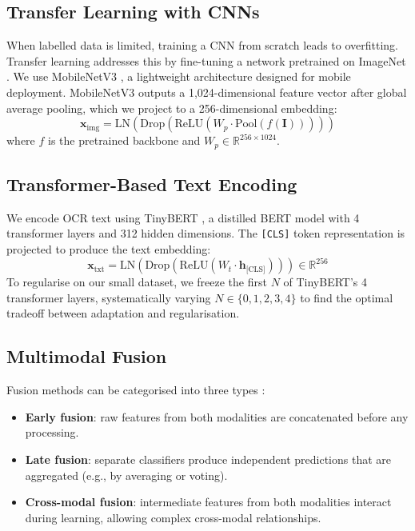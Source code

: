 \documentclass{article}
\begin{document}
\subsection{Transfer Learning with CNNs}

When labelled data is limited, training a CNN from scratch leads to overfitting. Transfer learning addresses this by fine-tuning a network pretrained on ImageNet \citep{krizhevsky2012imagenet}. We use MobileNetV3 \citep{howard2019mobilenet}, a lightweight architecture designed for mobile deployment. MobileNetV3 outputs a 1,024-dimensional feature vector after global average pooling, which we project to a 256-dimensional embedding:
\begin{equation}
    \mathbf{x}_{\text{img}} = \text{LN}(\text{Drop}(\text{ReLU}(W_p \cdot \text{Pool}(f(\mathbf{I})))))
\end{equation}
where $f$ is the pretrained backbone and $W_p \in \mathbb{R}^{256 \times 1024}$.

\subsection{Transformer-Based Text Encoding}

We encode OCR text using TinyBERT \citep{jiao2020tinybert}, a distilled BERT model \citep{devlin2019bert} with 4 transformer layers and 312 hidden dimensions. The \texttt{[CLS]} token representation is projected to produce the text embedding:
\begin{equation}
    \mathbf{x}_{\text{txt}} = \text{LN}(\text{Drop}(\text{ReLU}(W_t \cdot \mathbf{h}_{\text{[CLS]}}))) \in \mathbb{R}^{256}
\end{equation}
To regularise on our small dataset, we freeze the first $N$ of TinyBERT's 4 transformer layers, systematically varying $N \in \{0, 1, 2, 3, 4\}$ to find the optimal tradeoff between adaptation and regularisation.

\subsection{Multimodal Fusion}

Fusion methods can be categorised into three types \citep{pettersson2024multimodal}:

\begin{itemize}[nosep,leftmargin=*]
    \item \textbf{Early fusion}: raw features from both modalities are concatenated before any processing.
    \item \textbf{Late fusion}: separate classifiers produce independent predictions that are aggregated (e.g., by averaging or voting).
    \item \textbf{Cross-modal fusion}: intermediate features from both modalities interact during learning, allowing complex cross-modal relationships.
\end{itemize}
\end{document}
